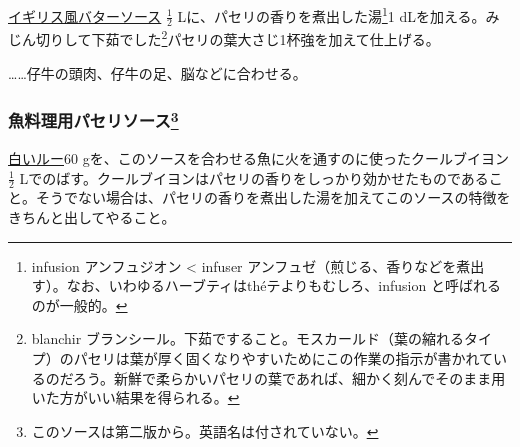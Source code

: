 \begin{recette}

\protect\hyperlink{bread-sauce}{イギリス風バターソース} \(\frac{1}{2}\)
Lに、パセリの香りを煮出した湯\footnote{infusion アンフュジオン
  \textless{} infuser
  アンフュゼ（煎じる、香りなどを煮出す）。なお、いわゆるハーブティはthéテよりもむしろ、infusion
  と呼ばれるのが一般的。}1
dLを加える。みじん切りして下茹でした\footnote{blanchir
  ブランシール。下茹ですること。モスカールド（葉の縮れるタイプ）のパセリは葉が厚く固くなりやすいためにこの作業の指示が書かれているのだろう。新鮮で柔らかいパセリの葉であれば、細かく刻んでそのまま用いた方がいい結果を得られる。}パセリの葉大さじ1杯強を加えて仕上げる。

\ldots{}\ldots{}仔牛の頭肉、仔牛の足、脳などに合わせる。

\hypertarget{ux9b5aux6599ux7406ux7528ux30d1ux30bbux30eaux30bdux30fcux30b945bis}{%
\subsubsection[魚料理用パセリソース]{\texorpdfstring{魚料理用パセリソース\footnote{このソースは第二版から。英語名は付されていない。}}{魚料理用パセリソース}}\label{ux9b5aux6599ux7406ux7528ux30d1ux30bbux30eaux30bdux30fcux30b945bis}}



\protect\hyperlink{roux-blanc}{白いルー}60
gを、このソースを合わせる魚に火を通すのに使ったクールブイヨン
\(\frac{1}{2}\)
Lでのばす。クールブイヨンはパセリの香りをしっかり効かせたものであること。そうでない場合は、パセリの香りを煮出した湯を加えてこのソースの特徴をきちんと出してやること。


\end{recette}

